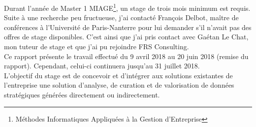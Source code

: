 Durant l'année de Master 1 MIAGE\footnote{Méthodes Informatiques Appliquées à la Gestion d'Entreprise}, un stage de trois mois minimum est requis.\\

Suite à une recherche peu fructueuse, j'ai contacté François Delbot, maître de conférences à l'Université de Paris-Nanterre pour lui demander s'il n'avait pas des offres de stage disponibles. C'est ainsi que j'ai pris contact avec Gaétan Le Chat, mon tuteur de stage et que j'ai pu rejoindre FRS Consulting.\\

Ce rapport présente le travail effectué du 9 avril 2018 au 20 juin 2018  (remise du rapport). Cependant, celui-ci continuera jusqu'au 31 juillet 2018.\\

L'objectif du stage est de concevoir et d’intégrer aux solutions existantes de l'entreprise une solution d’analyse, de curation et de valorisation de données stratégiques générées directement ou indirectement.\\
